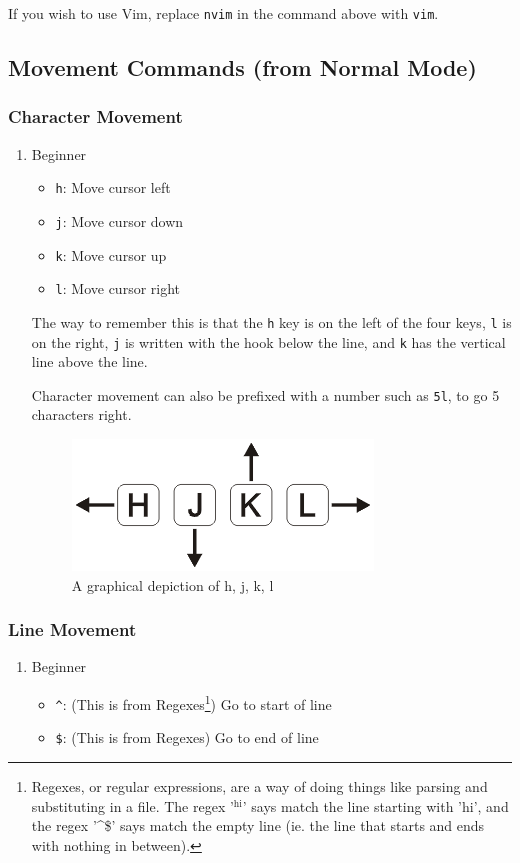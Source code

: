 \documentclass[11pt]{article}
\begin{document}
If you wish to use Vim, replace \texttt{nvim} in the command above with \texttt{vim}.
\subsection{Movement Commands (from Normal Mode)}
\label{sec:org730eaf4}
\subsubsection{Character Movement}
\label{sec:org8827423}
\begin{enumerate}
\item Beginner
\label{sec:org91013e2}
\begin{itemize}
\item \texttt{h}: Move cursor left
\item \texttt{j}: Move cursor down
\item \texttt{k}: Move cursor up
\item \texttt{l}: Move cursor right
\end{itemize}

The way to remember this is that the \texttt{h} key is on the left of the four keys,
\texttt{l} is on the right, \texttt{j} is written with the hook below the line, and \texttt{k} has
the vertical line above the line.

Character movement can also be prefixed with a number such as \texttt{5l}, to go
5 characters right.

\begin{figure}[htbp]
\centering
\includegraphics[width=.9\linewidth]{./hjkl.png}
\caption{\label{fig:org7ad55d5}
A graphical depiction of h, j, k, l}
\end{figure}
\end{enumerate}
\subsubsection{Line Movement}
\label{sec:org6578a39}
\begin{enumerate}
\item Beginner
\label{sec:org1bcfd16}
\begin{itemize}
\item \texttt{\textasciicircum{}}: (This is from Regexes\footnote{Regexes, or regular expressions, are a way of doing things like parsing
and substituting in a file. The regex '\(^{\text{hi}}\)' says match the line starting with
'hi', and the regex '\^{}\$' says match the empty line (ie. the line that starts and
ends with nothing in between).}) Go to start of line
\item \texttt{\$}: (This is from Regexes) Go to end of line
\end{itemize}
\end{enumerate}
\end{document}
